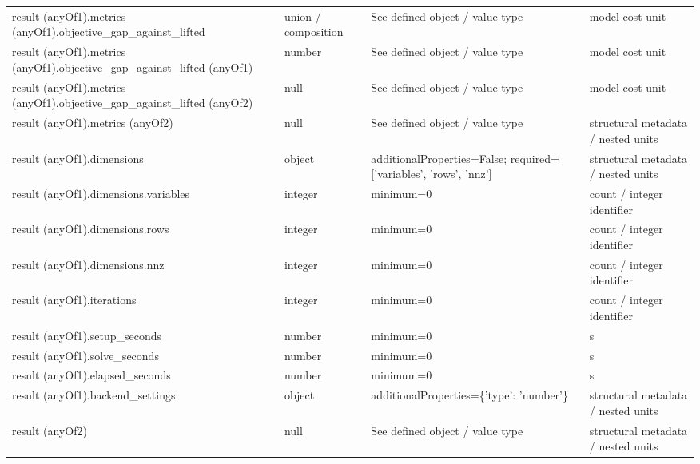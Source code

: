 \begin{longtable}{@{}>{\raggedright\arraybackslash}p{}>{\raggedright\arraybackslash}p{}>{\raggedright\arraybackslash}p{}>{\raggedright\arraybackslash}p{}@{}}
result (anyOf1).\allowbreak{}metrics (anyOf1).\allowbreak{}objective\_\allowbreak{}gap\_\allowbreak{}against\_\allowbreak{}lifted & union /\allowbreak{} composition & See defined object /\allowbreak{} value type & model cost unit\\
result (anyOf1).\allowbreak{}metrics (anyOf1).\allowbreak{}objective\_\allowbreak{}gap\_\allowbreak{}against\_\allowbreak{}lifted (anyOf1) & number & See defined object /\allowbreak{} value type & model cost unit\\
result (anyOf1).\allowbreak{}metrics (anyOf1).\allowbreak{}objective\_\allowbreak{}gap\_\allowbreak{}against\_\allowbreak{}lifted (anyOf2) & null & See defined object /\allowbreak{} value type & model cost unit\\
result (anyOf1).\allowbreak{}metrics (anyOf2) & null & See defined object /\allowbreak{} value type & structural metadata /\allowbreak{} nested units\\
result (anyOf1).\allowbreak{}dimensions & object & additionalProperties=\allowbreak{}False; required=\allowbreak{}['variables', 'rows', 'nnz'] & structural metadata /\allowbreak{} nested units\\
result (anyOf1).\allowbreak{}dimensions.\allowbreak{}variables & integer & minimum=\allowbreak{}0 & count /\allowbreak{} integer identifier\\
result (anyOf1).\allowbreak{}dimensions.\allowbreak{}rows & integer & minimum=\allowbreak{}0 & count /\allowbreak{} integer identifier\\
result (anyOf1).\allowbreak{}dimensions.\allowbreak{}nnz & integer & minimum=\allowbreak{}0 & count /\allowbreak{} integer identifier\\
result (anyOf1).\allowbreak{}iterations & integer & minimum=\allowbreak{}0 & count /\allowbreak{} integer identifier\\
result (anyOf1).\allowbreak{}setup\_\allowbreak{}seconds & number & minimum=\allowbreak{}0 & s\\
result (anyOf1).\allowbreak{}solve\_\allowbreak{}seconds & number & minimum=\allowbreak{}0 & s\\
result (anyOf1).\allowbreak{}elapsed\_\allowbreak{}seconds & number & minimum=\allowbreak{}0 & s\\
result (anyOf1).\allowbreak{}backend\_\allowbreak{}settings & object & additionalProperties=\allowbreak{}\{'type': 'number'\} & structural metadata /\allowbreak{} nested units\\
result (anyOf2) & null & See defined object /\allowbreak{} value type & structural metadata /\allowbreak{} nested units\\

\end{longtable}
